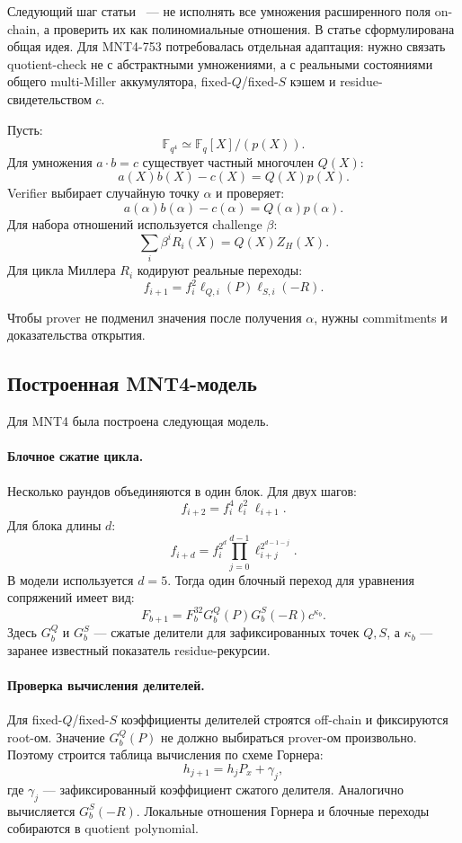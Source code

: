 \documentclass[12pt,a4paper]{article}
\newcommand{\Fq}{\mathbb{F}_q}
\begin{document}
Следующий шаг статьи~\cite{eprint640} --- не исполнять все умножения
расширенного поля on-chain, а проверить их как полиномиальные отношения.
В статье сформулирована общая идея. Для MNT4-753 потребовалась отдельная
адаптация: нужно связать quotient-check не с абстрактными умножениями, а с
реальными состояниями общего multi-Miller аккумулятора, fixed-$Q$/fixed-$S$
кэшем и residue-свидетельством $c$.

Пусть:
\[
    \mathbb{F}_{q^4}\simeq \Fq[X]/(p(X)).
\]
Для умножения $a\cdot b=c$ существует частный многочлен $Q(X)$:
\[
    a(X)b(X)-c(X)=Q(X)p(X).
\]
Verifier выбирает случайную точку $\alpha$ и проверяет:
\[
    a(\alpha)b(\alpha)-c(\alpha)=Q(\alpha)p(\alpha).
\]
Для набора отношений используется challenge $\beta$:
\[
    \sum_i\beta^i R_i(X)=Q(X)Z_H(X).
\]
Для цикла Миллера $R_i$ кодируют реальные переходы:
\[
    f_{i+1}=f_i^2\ell_{Q,i}(P)\ell_{S,i}(-R).
\]

Чтобы prover не подменил значения после получения $\alpha$, нужны commitments
и доказательства открытия.

\subsection{Построенная MNT4-модель}

Для MNT4 была построена следующая модель.

\paragraph{Блочное сжатие цикла.}
Несколько раундов объединяются в один блок. Для двух шагов:
\[
    f_{i+2}
    =
    f_i^4\ell_i^2\ell_{i+1}.
\]
Для блока длины $d$:
\[
    f_{i+d}
    =
    f_i^{2^d}
    \prod_{j=0}^{d-1}\ell_{i+j}^{2^{d-1-j}}.
\]
В модели используется $d=5$. Тогда один блочный переход для уравнения
сопряжений имеет вид:
\[
    F_{b+1}
    =
    F_b^{32}
    G_b^Q(P)
    G_b^S(-R)
    c^{\kappa_b}.
\]
Здесь $G_b^Q$ и $G_b^S$ --- сжатые делители для зафиксированных точек
$Q,S$, а $\kappa_b$ --- заранее известный показатель residue-рекурсии.

\paragraph{Проверка вычисления делителей.}
Для fixed-$Q$/fixed-$S$ коэффициенты делителей строятся off-chain и
фиксируются root-ом. Значение $G_b^Q(P)$ не должно выбираться prover-ом
произвольно. Поэтому строится таблица вычисления по схеме Горнера:
\[
    h_{j+1}=h_j P_x+\gamma_j,
\]
где $\gamma_j$ --- зафиксированный коэффициент сжатого делителя. Аналогично
вычисляется $G_b^S(-R)$. Локальные отношения Горнера и блочные переходы
собираются в quotient polynomial.
\end{document}
